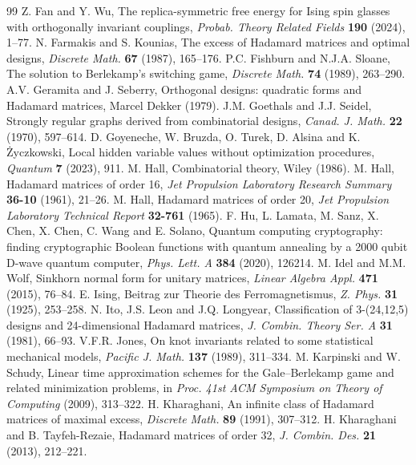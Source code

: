 \documentclass[11pt,a4paper]{article}
\theoremstyle{remark}
\begin{document}
\begin{thebibliography}{99}
Z. Fan and Y. Wu, The replica-symmetric free energy for Ising spin glasses with orthogonally invariant couplings, \emph{Probab. Theory Related Fields} \textbf{190} (2024), 1--77.
N. Farmakis and S. Kounias, The excess of Hadamard matrices and optimal designs, \emph{Discrete Math.} \textbf{67} (1987), 165--176.
P.C. Fishburn and N.J.A. Sloane, The solution to Berlekamp's switching game, \emph{Discrete Math.} \textbf{74} (1989), 263--290.
A.V. Geramita and J. Seberry, Orthogonal designs: quadratic forms and Hadamard matrices, Marcel Dekker (1979).
J.M. Goethals and J.J. Seidel, Strongly regular graphs derived from combinatorial designs, \emph{Canad. J. Math.} \textbf{22} (1970), 597--614.
D. Goyeneche, W. Bruzda, O. Turek, D. Alsina and K. \.Zyczkowski, Local hidden variable values without optimization procedures, \emph{Quantum} \textbf{7} (2023), 911.
M. Hall, Combinatorial theory, Wiley (1986).
M. Hall, Hadamard matrices of order 16, \emph{Jet Propulsion Laboratory Research Summary} \textbf{36-10} (1961), 21--26.
M. Hall, Hadamard matrices of order 20, \emph{Jet Propulsion Laboratory Technical Report} \textbf{32-761} (1965).
F. Hu, L. Lamata, M. Sanz, X. Chen, X. Chen, C. Wang and E. Solano, Quantum computing cryptography: finding cryptographic Boolean functions with quantum annealing by a 2000 qubit D-wave quantum computer, \emph{Phys. Lett. A} \textbf{384} (2020), 126214.
M. Idel and M.M. Wolf, Sinkhorn normal form for unitary matrices, \emph{Linear Algebra Appl.} \textbf{471} (2015), 76--84.
E. Ising, Beitrag zur Theorie des Ferromagnetismus, \emph{Z. Phys.} \textbf{31} (1925), 253--258.
N. Ito, J.S. Leon and J.Q. Longyear, Classification of 3-(24,12,5) designs and 24-dimensional Hadamard matrices, \emph{J. Combin. Theory Ser. A} \textbf{31} (1981), 66--93.
V.F.R. Jones, On knot invariants related to some statistical mechanical models, \emph{Pacific J. Math.} \textbf{137} (1989), 311--334.
M. Karpinski and W. Schudy, Linear time approximation schemes for the Gale--Berlekamp game and related minimization problems, in \emph{Proc. 41st ACM Symposium on Theory of Computing} (2009), 313--322.
H. Kharaghani, An infinite class of Hadamard matrices of maximal excess, \emph{Discrete Math.} \textbf{89} (1991), 307--312.
H. Kharaghani and B. Tayfeh-Rezaie, Hadamard matrices of order 32, \emph{J. Combin. Des.} \textbf{21} (2013), 212--221.

\end{thebibliography}
\end{document}
